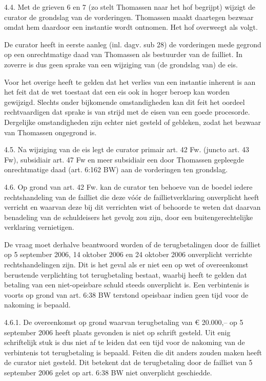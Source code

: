 \documentclass[
  dutch,
  a4paper,
]{article}
\begin{document}
4.4. Met de grieven 6 en 7 (zo stelt Thomassen naar het hof begrijpt) wijzigt de curator de grondslag van de vorderingen. Thomassen maakt daartegen bezwaar omdat hem daardoor een instantie wordt ontnomen. Het hof overweegt als volgt.

De curator heeft in eerste aanleg (inl. dagv. sub 28) de vorderingen mede gegrond op een onrechtmatige daad van Thomassen als bestuurder van de failliet. In zoverre is dus geen sprake van een wijziging van (de grondslag van) de eis.

Voor het overige heeft te gelden dat het verlies van een instantie inherent is aan het feit dat de wet toestaat dat een eis ook in hoger beroep kan worden gewijzigd. Slechts onder bijkomende omstandigheden kan dit feit het oordeel rechtvaardigen dat sprake is van strijd met de eisen van een goede procesorde. Dergelijke omstandigheden zijn echter niet gesteld of gebleken, zodat het bezwaar van Thomassen ongegrond is.

4.5. Na wijziging van de eis legt de curator primair art. 42 Fw. (juncto art. 43 Fw), subsidiair art. 47 Fw en meer subsidiair een door Thomassen gepleegde onrechtmatige daad (art. 6:162 BW) aan de vorderingen ten grondslag.

4.6. Op grond van art. 42 Fw. kan de curator ten behoeve van de boedel iedere rechtshandeling van de failliet die deze vóór de faillietverklaring onverplicht heeft verricht en waarvan deze bij dit verrichten wist of behoorde te weten dat daarvan benadeling van de schuldeisers het gevolg zou zijn, door een buitengerechtelijke verklaring vernietigen.

De vraag moet derhalve beantwoord worden of de terugbetalingen door de failliet op 5 september 2006, 14 oktober 2006 en 24 oktober 2006 onverplicht verrichte rechtshandelingen zijn. Dit is het geval als er niet een op wet of overeenkomst berustende verplichting tot terugbetaling bestaat, waarbij heeft te gelden dat betaling van een niet-opeisbare schuld steeds onverplicht is. Een verbintenis is voorts op grond van art. 6:38 BW terstond opeisbaar indien geen tijd voor de nakoming is bepaald.

4.6.1. De overeenkomst op grond waarvan terugbetaling van € 20.000,-- op 5 september 2006 heeft plaats gevonden is niet op schrift gesteld. Uit enig schriftelijk stuk is dus niet af te leiden dat een tijd voor de nakoming van de verbintenis tot terugbetaling is bepaald. Feiten die dit anders zouden maken heeft de curator niet gesteld. Dit betekent dat de terugbetaling door de failliet van 5 september 2006 gelet op art. 6:38 BW niet onverplicht geschiedde.
\end{document}
